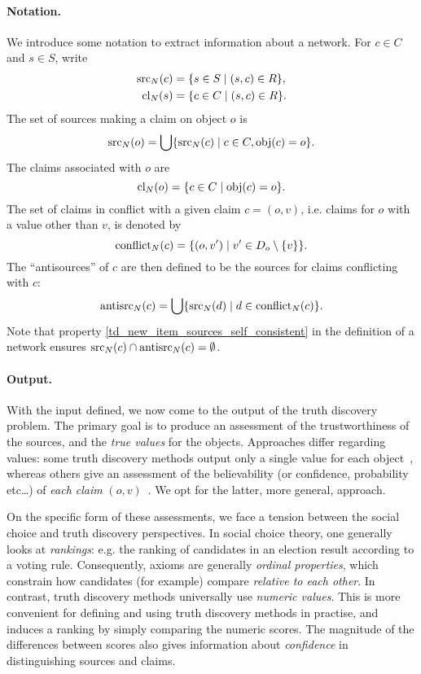 \paragraph{Notation.}

We introduce some notation to extract information about a network. For $c \in
C$ and $s \in S$, write
\begin{align*}
    \operatorname{src}_N(c) &= \{s \in S \mid (s, c) \in R\},\\
    \operatorname{cl}_N(s) &= \{c \in C \mid (s, c) \in R\}.
\end{align*}
The set of sources making a claim on object $o$ is
\[
    \operatorname{src}_N(o) = \bigcup\{\operatorname{src}_N(c) \mid c \in C, \operatorname{obj}(c) = o\}.
\]
The claims associated with $o$ are
\[
    \operatorname{cl}_N(o) = \{c \in C \mid \operatorname{obj}(c) = o\}.
\]
The set of claims in conflict with a given claim $c = (o, v)$, i.e.  claims for
$o$ with a value other than $v$, is denoted by
\[
    \operatorname{conflict}_N(c) = \{(o, v') \mid v' \in D_o \setminus \{v\}\}.
\]
The ``antisources'' of $c$ are then defined to be the sources for claims
conflicting with $c$:
\[
    \operatorname{antisrc}_N(c) = \bigcup\{\operatorname{src}_N(d) \mid d \in \operatorname{conflict}_N(c)\}.
\]
Note that property \cref{td_new_item_sources_self_consistent} in the definition
of a network ensures $\operatorname{src}_N(c) \cap \operatorname{antisrc}_N(c) = \emptyset$.

\paragraph{Output.}

With the input defined, we now come to the output of the truth discovery
problem.
The primary goal is to produce an assessment of the trustworthiness of the
sources, and the \emph{true values} for the objects. Approaches differ
regarding values: some truth discovery methods output only a single value for
each object~\cite{li2016,ding_finding_2016,yang_continuous_2018}, whereas
others give an assessment of the believability (or confidence, probability
etc\ldots) of \emph{each claim} $(o,
v)$~\cite{yin2008,pasternack2010,galland2010,zhi2015,zhang_robust_2016,zhang2018}.
We opt for the latter, more general, approach.

On the specific form of these assessments, we face a tension between the social
choice and truth discovery perspectives. In social choice theory, one generally
looks at \emph{rankings}: e.g. the ranking of candidates in an election result
according to a voting rule. Consequently, axioms are generally \emph{ordinal
properties}, which constrain how candidates (for example) compare
\emph{relative to each other}. In contrast, truth discovery methods universally
use \emph{numeric values}. This is more convenient for defining and using truth
discovery methods in practise, and induces a ranking by simply comparing the
numeric scores. The magnitude of the differences between scores also gives
information about \emph{confidence} in distinguishing sources and claims.

